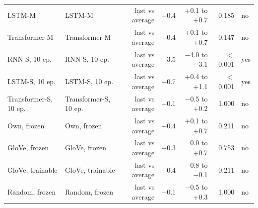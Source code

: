 \begin{tabular}{@{}llrrrrl@{}}
LSTM-M & LSTM-M & last vs average & +0.4 & +0.1 to +0.7 & 0.185 & no \\
Transformer-M & Transformer-M & last vs average & +0.4 & +0.1 to +0.7 & 0.147 & no \\
RNN-S, 10 ep. & RNN-S, 10 ep. & last vs average & $-$3.5 & $-$4.0 to $-$3.1 & $<$0.001 & yes \\
LSTM-S, 10 ep. & LSTM-S, 10 ep. & last vs average & +0.7 & +0.4 to +1.1 & $<$0.001 & yes \\
Transformer-S, 10 ep. & Transformer-S, 10 ep. & last vs average & $-$0.1 & $-$0.5 to +0.2 & 1.000 & no \\
Own, frozen & Own, frozen & last vs average & +0.4 & +0.1 to +0.7 & 0.211 & no \\
GloVe, frozen & GloVe, frozen & last vs average & +0.3 & 0.0 to +0.7 & 0.753 & no \\
GloVe, trainable & GloVe, trainable & last vs average & $-$0.4 & $-$0.8 to $-$0.1 & 0.211 & no \\
Random, frozen & Random, frozen & last vs average & $-$0.1 & $-$0.5 to +0.3 & 1.000 & no \\
\bottomrule
\end{tabular}
